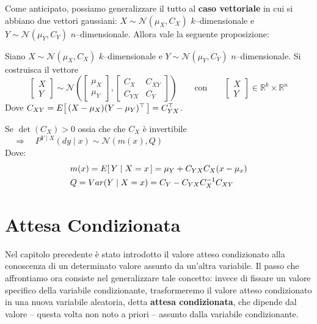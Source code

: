 \bigskip
\noindent Come anticipato, possiamo generalizzare il tutto al \textbf{caso vettoriale} in cui si abbiano due vettori gaussiani: $X\sim\mathcal{N}(\mu_X, C_X)$ $k$--dimensionale e $Y\sim\mathcal{N}(\mu_Y, C_Y)$ $n$--dimensionale. Allora vale la seguente proposizione:
\begin{proposizione}
    Siano $X\sim\mathcal{N}(\mu_X, C_X)$ $k$--dimensionale e $Y\sim\mathcal{N}(\mu_Y, C_Y)$ $n$--dimensionale. Si costruisca il vettore
    \[\begin{bmatrix}X\\Y\end{bmatrix} \sim \mathcal{N}\left(\begin{bmatrix}\mu_X\\\mu_Y\end{bmatrix}, \begin{bmatrix}C_X & C_{XY}\\ C_{YX}& C_Y\end{bmatrix}\right)\qquad \text{con} \qquad \begin{bmatrix}X\\Y\end{bmatrix}\in \mathbb{R}^{k}\times \mathbb{R}^n\]
    Dove $C_{XY} = E\!\left[\,(X-\mu_X)(Y-\mu_Y)^\top\,\right] = C_{YX}^\top$.

    \bigskip
    \noindent Se $\det(C_X)>0$ ossia che che $C_X$ è invertibile $\quad \Rightarrow\quad \boxed{P^{Y\mid X}(dy\mid x)\sim \mathcal{N}(m(x), Q)}$\\
    Dove:
    \begin{align*}
        & m(x) = E\!\left[\,Y\mid X=x\,\right] = \mu_Y + C_{YX}C_X(x-\mu_x)\\
        & Q = Var(Y\mid X = x) = C_Y - C_{YX}C^{-1}_XC_{XY}
    \end{align*}
\end{proposizione}

\section{Attesa Condizionata}

Nel capitolo precedente è stato introdotto il valore atteso condizionato alla conoscenza di un determinato valore assunto da un'altra variabile. Il passo che affrontiamo ora consiste nel generalizzare tale concetto: invece di fissare un valore specifico della variabile condizionante, trasformeremo il valore atteso condizionato in una nuova variabile aleatoria, detta \textbf{attesa condizionata}, che dipende dal valore -- questa volta non noto a priori -- assunto dalla variabile condizionante.

